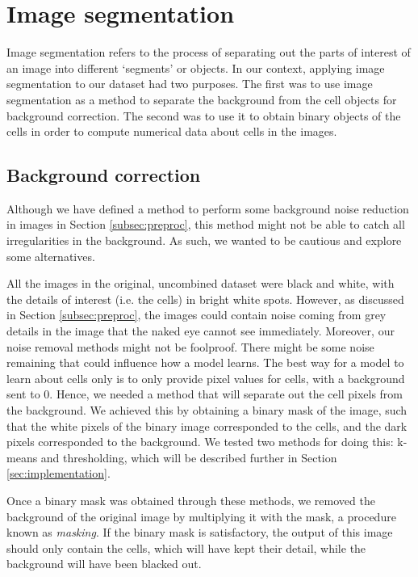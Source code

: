 \section{Image segmentation} \label{sec:segmentation}

Image segmentation refers to the process of separating out the parts of interest of an image into different `segments' or objects. In our context, applying image segmentation to our dataset had two purposes. The first was to use image segmentation as a method to separate the background from the cell objects for background correction. The second was to use it to obtain binary objects of the cells in order to compute numerical data about cells in the images. 

\subsection{Background correction} \label{subsec:correction}

Although we have defined a method to perform some background noise reduction in images in Section \ref{subsec:preproc}, this method might not be able to catch all irregularities in the background. As such, we wanted to be cautious and explore some alternatives. 

All the images in the original, uncombined dataset were black and white, with the details of interest (i.e. the cells) in bright white spots. However, as discussed in Section \ref{subsec:preproc}, the images could contain noise coming from grey details in the image that the naked eye cannot see immediately. Moreover, our noise removal methods might not be foolproof. There might be some noise remaining that could influence how a model learns. The best way for a model to learn about cells only is to only provide pixel values for cells, with a background sent to 0. Hence, we needed a method that will separate out the cell pixels from the background. We achieved this by obtaining a binary mask of the image, such that the white pixels of the binary image corresponded to the cells, and the dark pixels corresponded to the background. We tested two methods for doing this: k-means and thresholding, which will be described further in Section \ref{sec:implementation}.

Once a binary mask was obtained through these methods, we removed the background of the original image by multiplying it with the mask, a procedure known as \textit{masking}. If the binary mask is satisfactory, the output of this image should only contain the cells, which will have kept their detail, while the background will have been blacked out. 

